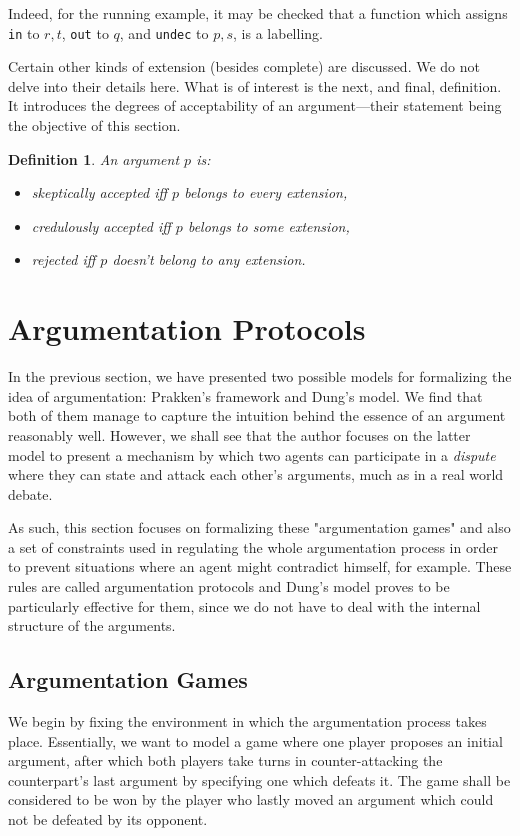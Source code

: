 \documentclass[12pt, a4paper]{article}
\newtheorem{Def}{Definition}[subsection]
\begin{document}
Indeed, for the running example, it may be checked that a function which assigns \texttt{in} to $r, t$, \texttt{out} to $q$, and \texttt{undec} to $p, s$, is a labelling.

Certain other kinds of extension (besides complete) are discussed. We do not delve into their details here. What is of interest is the next, and final, definition. It introduces the degrees of acceptability of an argument---their statement being the objective of this section.

\begin{Def}
An argument $p$ is:
\begin{itemize}
\item \emph{skeptically accepted} iff $p$ belongs to every extension,
\item \emph{credulously accepted} iff $p$ belongs to some extension,
\item \emph{rejected} iff $p$ doesn't belong to any extension.
\end{itemize}
\end{Def}

\newpage

\section{Argumentation Protocols}
In the previous section, we have presented two possible models for formalizing the idea of argumentation: Prakken's framework and Dung's model. We find that both of them manage to  capture the intuition behind the essence of an argument reasonably well. However, we shall see that the author focuses on the latter model to present a mechanism by which two agents can participate in a \emph{dispute} where they can state and attack each other's arguments, much as in a real world debate.

As such, this section focuses on formalizing these "argumentation games" and also a set of constraints used in regulating the whole argumentation process in order to prevent situations where an agent might contradict himself, for example. These rules are called argumentation protocols and Dung's model proves to be particularly effective for them, since we do not have to deal with the internal structure of the arguments.

\subsection{Argumentation Games}
We begin by fixing the environment in which the argumentation process takes place. Essentially, we want to model a game where one player proposes an initial argument, after which both players take turns in counter-attacking the counterpart's last argument by specifying one which defeats it. The game shall be considered to be won by the player who lastly moved an argument which could not be defeated by its opponent.
\end{document}
